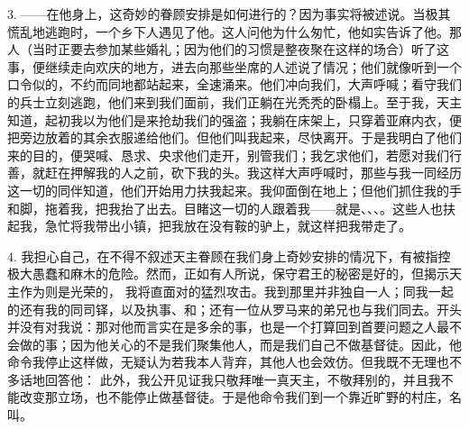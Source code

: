 3. ——在他身上，这奇妙的眷顾安排是如何进行的？因为事实将被述说。当极其慌乱地逃跑时，一个乡下人遇见了他。这人问他为什么匆忙，他如实告诉了他。那人（当时正要去参加某些婚礼；因为他们的习惯是整夜聚在这样的场合）听了这事，便继续走向欢庆的地方，进去向那些坐席的人述说了情况；他们就像听到一个口令似的，不约而同地都站起来，全速涌来。他们冲向我们，大声呼喊；看守我们的兵士立刻逃跑，他们来到我们面前，我们正躺在光秃秃的卧榻上。至于我，天主知道，起初我以为他们是来抢劫我们的强盗；我躺在床架上，只穿着亚麻内衣，便把旁边放着的其余衣服递给他们。但他们叫我起来，尽快离开。于是我明白了他们来的目的，便哭喊、恳求、央求他们走开，别管我们；我乞求他们，若愿对我们行善，就赶在押解我的人之前，砍下我的头。我这样大声呼喊时，那些与我一同经历这一切的同伴知道，他们开始用力扶我起来。我仰面倒在地上；但他们抓住我的手和脚，拖着我，把我抬了出去。目睹这一切的人跟着我——就是、、、。这些人也扶起我，急忙将我带出小镇，把我放在没有鞍的驴上，就这样把我带走了。\par

4. 我担心自己，在不得不叙述天主眷顾在我们身上奇妙安排的情况下，有被指控极大愚蠢和麻木的危险。然而，正如有人所说，保守君王的秘密是好的，但揭示天主作为则是光荣的， 我将直面对的猛烈攻击。我到那里并非独自一人；同我一起的还有我的同司铎，以及执事、和；还有一位从罗马来的弟兄也与我们同去。开头并没有对我说：那对他而言实在是多余的事，也是一个打算回到首要问题之人最不会做的事；因为他关心的不是我们聚集他人，而是我们自己不做基督徒。因此，他命令我停止这样做，无疑认为若我本人背弃，其他人也会效仿。但我既不无理也不多话地回答他： 此外，我公开见证我只敬拜唯一真天主，不敬拜别的，并且我不能改变那立场，也不能停止做基督徒。于是他命令我们到一个靠近旷野的村庄，名叫。\par

